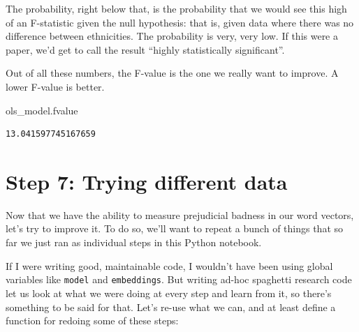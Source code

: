 \documentclass[]{book}
\newenvironment{Shaded}{\begin{snugshade}}{\end{snugshade}}
\newcommand{\NormalTok}[1]{#1}
\theoremstyle{definition}
\theoremstyle{definition}
\theoremstyle{definition}
\theoremstyle{remark}
\begin{document}
The probability, right below that, is the probability that we would see
this high of an F-statistic given the null hypothesis: that is, given
data where there was no difference between ethnicities. The probability
is very, very low. If this were a paper, we'd get to call the result
``highly statistically significant''.

Out of all these numbers, the F-value is the one we really want to
improve. A lower F-value is better.

\begin{Shaded}
\begin{Highlighting}[]
\NormalTok{ols_model.fvalue}
\end{Highlighting}
\end{Shaded}

\begin{verbatim}
13.041597745167659
\end{verbatim}

\section{Step 7: Trying different
data}\label{step-7-trying-different-data}

Now that we have the ability to measure prejudicial badness in our word
vectors, let's try to improve it. To do so, we'll want to repeat a bunch
of things that so far we just ran as individual steps in this Python
notebook.

If I were writing good, maintainable code, I wouldn't have been using
global variables like \texttt{model} and \texttt{embeddings}. But
writing ad-hoc spaghetti research code let us look at what we were doing
at every step and learn from it, so there's something to be said for
that. Let's re-use what we can, and at least define a function for
redoing some of these steps:
\end{document}
